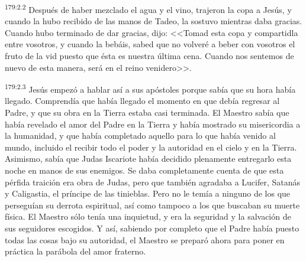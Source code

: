 \par 
\textsuperscript{179:2.2} Después de haber mezclado el agua y el vino, trajeron la copa a Jesús, y cuando la hubo recibido de las manos de Tadeo, la sostuvo mientras daba gracias. Cuando hubo terminado de dar gracias, dijo: <<Tomad esta copa y compartidla entre vosotros, y cuando la bebáis, sabed que no volveré a beber con vosotros el fruto de la vid puesto que ésta es nuestra última cena. Cuando nos sentemos de nuevo de esta manera, será en el reino venidero>>.

\par 
\textsuperscript{179:2.3} Jesús empezó a hablar así a sus apóstoles porque sabía que su hora había llegado. Comprendía que había llegado el momento en que debía regresar al Padre, y que su obra en la Tierra estaba casi terminada. El Maestro sabía que había revelado el amor del Padre en la Tierra y había mostrado su misericordia a la humanidad, y que había completado aquello para lo que había venido al mundo, incluido el recibir todo el poder y la autoridad en el cielo y en la Tierra. Asimismo, sabía que Judas Iscariote había decidido plenamente entregarlo esta noche en manos de sus enemigos. Se daba completamente cuenta de que esta pérfida traición era obra de Judas, pero que también agradaba a Lucifer, Satanás y Caligastia, el príncipe de las tinieblas. Pero no le temía a ninguno de los que perseguían su derrota espiritual, así como tampoco a los que buscaban su muerte física. El Maestro sólo tenía una inquietud, y era la seguridad y la salvación de sus seguidores escogidos. Y así, sabiendo por completo que el Padre había puesto todas las cosas bajo su autoridad, el Maestro se preparó ahora para poner en práctica la parábola del amor fraterno.

